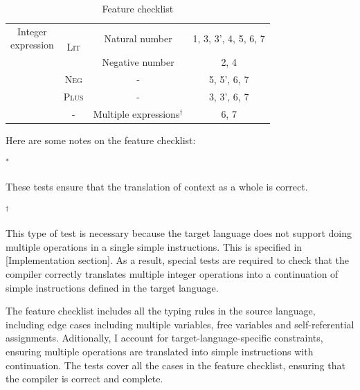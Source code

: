 \documentclass[12pt,twoside,a4paper]{report}
\theoremstyle{definition}
\theoremstyle{definition}
\theoremstyle{definition}
\theoremstyle{definition}
\begin{document}
\begin{table}[H]
\begin{tabular}{| c | c | c | c |}
            \multirowcell{5}{Integer\\expression} 
                & \multirow{2}{*}{\textsc{Lit}}  
                    & Natural number  & 1, 3, 3', 4, 5, 6, 7 \\ \cline{3-4}
                &   & Negative number & 2, 4 \\ \cline{2-4}
                & \textsc{Neg} & - & 5, 5', 6, 7  \\ \cline{2-4}
                & \textsc{Plus} & - & 3, 3', 6, 7  \\ \cline{2-4}
                & -             & Multiple expressions\hyperlink{note2}{$^{\dagger}$} & 6, 7 \\
            \hline
        \end{tabular}

        \caption{Feature checklist}
        \label{tab: feature_checklist}
    \end{table}

    Here are some notes on the feature checklist:

    \hypertarget{note1}{$^{\ast}$} These tests ensure that the translation of context as a whole is correct.

    \hypertarget{note2}{$^{\dagger}$} This type of test is necessary because the target language does not support doing multiple operations in a single simple instructions. This is specified in [Implementation section]. As a result, special tests are required to check that the compiler correctly translates multiple integer operations into a continuation of simple instructions defined in the target language. 

    \vspace{2.5em}

    The feature checklist includes all the typing rules in the source language, including edge cases including multiple variables, free variables and self-referential assignments. Aditionally, I account for target-language-specific constraints, ensuring multiple operations are translated into simple instructions with continuation. The tests cover all the cases in the feature checklist, ensuring that the compiler is correct and complete.
\end{document}
